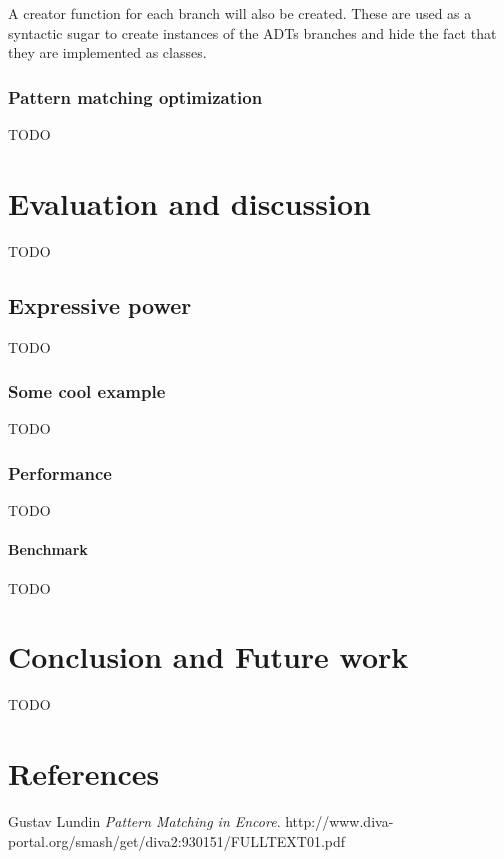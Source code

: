 \documentclass[10pt]{report}
\begin{document}
\par{\noindent A creator function for each branch will also be created. These are used as a syntactic sugar to create instances of the ADTs branches and hide the fact that they are implemented as classes.}

\subsection{Pattern matching optimization}
TODO

\chapter{Evaluation and discussion}
TODO
\section{Expressive power}
TODO
\subsection{Some cool example}
TODO
\subsection{Performance}
TODO
\subsubsection{Benchmark}
TODO
\chapter{Conclusion and Future work}
TODO

\printbibliography

\chapter{References}


\begin{thebibliography}{9}
Gustav Lundin
\textit{Pattern Matching in Encore}.
http://www.diva-portal.org/smash/get/diva2:930151/FULLTEXT01.pdf

\end{thebibliography}


\begin{appendices}
\end{appendices}
\end{document}
